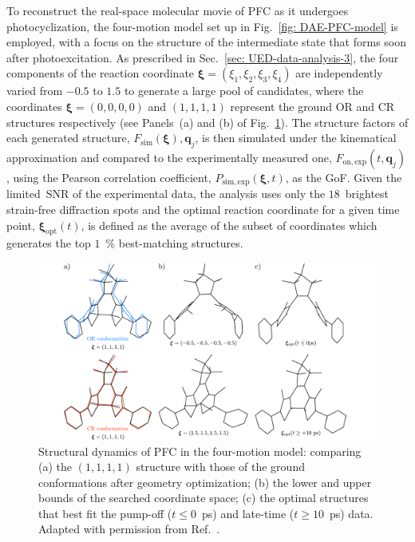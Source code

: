 To reconstruct the real-space molecular movie of PFC as it undergoes photocyclization,
the four-motion model set up in Fig.~\ref{fig: DAE-PFC-model} is employed,
with a focus on the structure of the intermediate state that forms soon after photoexcitation.
%
As prescribed in Sec.~\ref{sec: UED-data-analysis-3},
the four components of the reaction coordinate $\boldsymbol{\xi} = (\xi_1, \xi_2, \xi_3, \xi_4)$
are independently varied from $-0.5$ to $1.5$ to generate a large pool of candidates,
where the coordinates $\boldsymbol{\xi} = (0, 0, 0, 0)$ and $(1, 1, 1, 1)$ represent
the ground OR and CR structures respectively (see Panels~(a) and (b) of Fig.~\ref{fig: DAE-PFC-results}).
%
The structure factors of each generated structure, $F_\mathrm{sim}(\boldsymbol{\xi}), \boldsymbol{q}_j$,
is then simulated under the kinematical approximation and compared to the experimentally measured one,
$F_\mathrm{on, exp}(t, \boldsymbol{q}_j)$, using the Pearson correlation coefficient,
$P_\mathrm{sim, exp}(\boldsymbol{\xi}, t)$, as the GoF.
%
Given the limited~SNR of the experimental data, the analysis uses only
the $18$~brightest strain-free diffraction spots and the optimal reaction coordinate
for a given time point, $\boldsymbol{\xi}_\mathrm{opt}(t)$,
is defined as the average of the subset of coordinates
which generates the top $1$~\% best-matching structures.

\begin{figure}[t!]
  \centering
  \includegraphics[width = \textwidth]{Figures/fig_DAE_PFC_results.pdf}
  \caption[Structural dynamics of PFC in the four-motion model.]{
    Structural dynamics of PFC in the four-motion model:
    comparing (a) the $(1, 1, 1, 1)$ structure with those of
    the ground conformations after geometry optimization;
    (b) the lower and upper bounds of the searched coordinate space;
    (c) the optimal structures that best fit the pump-off ($t \leq 0$~ps)
    and late-time ($t \geq 10$~ps) data.
    Adapted with permission from Ref.~\cite{Jean-Ruel2013}.
  }
  \label{fig: DAE-PFC-results}
\end{figure}

